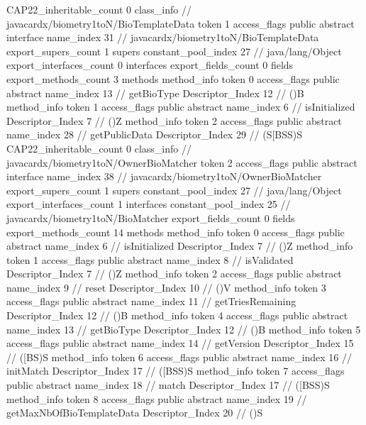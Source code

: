 {{{{{				}
			}
			CAP22_inheritable_count	0
		}
		class_info {		// javacardx/biometry1toN/BioTemplateData
			token	1
			access_flags	public abstract interface
			name_index	31		// javacardx/biometry1toN/BioTemplateData
			export_supers_count	1
			supers {
				constant_pool_index	27		// java/lang/Object
			}
			export_interfaces_count	0
			interfaces {
			}
			export_fields_count	0
			fields {
			}
			export_methods_count	3
			methods {
				method_info {
					token	0
					access_flags	public abstract
					name_index	13		// getBioType
					Descriptor_Index	12		// ()B
				}
				method_info {
					token	1
					access_flags	public abstract
					name_index	6		// isInitialized
					Descriptor_Index	7		// ()Z
				}
				method_info {
					token	2
					access_flags	public abstract
					name_index	28		// getPublicData
					Descriptor_Index	29		// (S[BSS)S
				}
			}
			CAP22_inheritable_count	0
		}
		class_info {		// javacardx/biometry1toN/OwnerBioMatcher
			token	2
			access_flags	public abstract interface
			name_index	38		// javacardx/biometry1toN/OwnerBioMatcher
			export_supers_count	1
			supers {
				constant_pool_index	27		// java/lang/Object
			}
			export_interfaces_count	1
			interfaces {
				constant_pool_index	25		// javacardx/biometry1toN/BioMatcher
			}
			export_fields_count	0
			fields {
			}
			export_methods_count	14
			methods {
				method_info {
					token	0
					access_flags	public abstract
					name_index	6		// isInitialized
					Descriptor_Index	7		// ()Z
				}
				method_info {
					token	1
					access_flags	public abstract
					name_index	8		// isValidated
					Descriptor_Index	7		// ()Z
				}
				method_info {
					token	2
					access_flags	public abstract
					name_index	9		// reset
					Descriptor_Index	10		// ()V
				}
				method_info {
					token	3
					access_flags	public abstract
					name_index	11		// getTriesRemaining
					Descriptor_Index	12		// ()B
				}
				method_info {
					token	4
					access_flags	public abstract
					name_index	13		// getBioType
					Descriptor_Index	12		// ()B
				}
				method_info {
					token	5
					access_flags	public abstract
					name_index	14		// getVersion
					Descriptor_Index	15		// ([BS)S
				}
				method_info {
					token	6
					access_flags	public abstract
					name_index	16		// initMatch
					Descriptor_Index	17		// ([BSS)S
				}
				method_info {
					token	7
					access_flags	public abstract
					name_index	18		// match
					Descriptor_Index	17		// ([BSS)S
				}
				method_info {
					token	8
					access_flags	public abstract
					name_index	19		// getMaxNbOfBioTemplateData
					Descriptor_Index	20		// ()S
}}}}}
